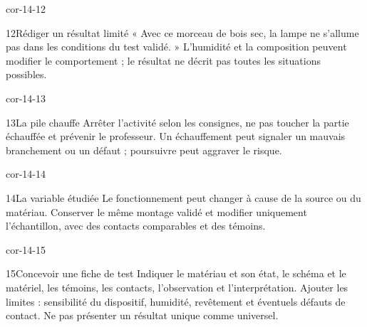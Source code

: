 \documentclass[12pt,twoside,openany]{book}
\begin{document}
\begin{blocLivre}{cor-14-12}
\begin{corrige}{12}{Rédiger un résultat limité}
« Avec ce morceau de bois sec, la lampe ne s’allume pas dans les conditions du test validé. » L’humidité et la composition peuvent modifier le comportement ; le résultat ne décrit pas toutes les situations possibles.\par
\end{corrige}\end{blocLivre}
\begin{blocLivre}{cor-14-13}
\begin{corrige}{13}{La pile chauffe}
Arrêter l’activité selon les consignes, ne pas toucher la partie échauffée et prévenir le professeur. Un échauffement peut signaler un mauvais branchement ou un défaut ; poursuivre peut aggraver le risque.\par
\end{corrige}\end{blocLivre}
\begin{blocLivre}{cor-14-14}
\begin{corrige}{14}{La variable étudiée}
Le fonctionnement peut changer à cause de la source ou du matériau. Conserver le même montage validé et modifier uniquement l’échantillon, avec des contacts comparables et des témoins.\par
\end{corrige}\end{blocLivre}
\begin{blocLivre}{cor-14-15}
\begin{corrige}{15}{Concevoir une fiche de test}
Indiquer le matériau et son état, le schéma et le matériel, les témoins, les contacts, l’observation et l’interprétation. Ajouter les limites : sensibilité du dispositif, humidité, revêtement et éventuels défauts de contact. Ne pas présenter un résultat unique comme universel.\par
\end{corrige}\end{blocLivre}
\label{solutions-14}
\end{document}
